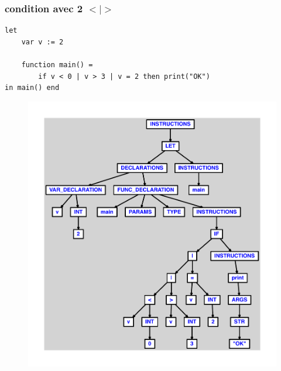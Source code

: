 \documentclass{article}
\begin{document}
\subsubsection{condition avec 2 $ < $$ | $$ > $}
\begin{lstlisting}
let
	var v := 2

	function main() =
		if v < 0 | v > 3 | v = 2 then print("OK")
in main() end
\end{lstlisting}
\newpage
\begin{figure}[H]
\centering
\includegraphics[max width=\textwidth]{ast/ast_283.pdf}
\end{figure}
\newpage
\end{document}
